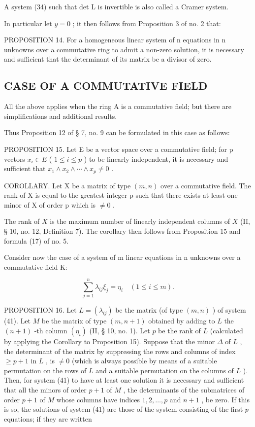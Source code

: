 A system (34) such that det L is invertible is also called a Cramer system.

In particular let \(y = 0\) ; it then follows from Proposition 3 of no. 2 that:

PROPOSITION 14. For a homogeneous linear system of n equations in n unknowns over a commutative ring to admit a non-zero solution, it is necessary and sufficient that the determinant of its matrix be a divisor of zero.

\subsection{CASE OF A COMMUTATIVE FIELD}

All the above applies when the ring A is a commutative field; but there are simplifications and additional results.

Thus Proposition 12 of § 7, no. 9 can be formulated in this case as follows:

PROPOSITION 15. Let E be a vector space over a commutative field; for p vectors \(x_{i} \in E\) ( \(1 \leqslant i \leqslant p\) ) to be linearly independent, it is necessary and sufficient that \(x_{1} \wedge x_{2} \wedge \cdots \wedge x_{p} \neq 0\) .

COROLLARY. Let X be a matrix of type \((m, n)\) over a commutative field. The rank of X is equal to the greatest integer p such that there exists at least one minor of X of order p which is \(\neq0\) .

The rank of \(X\) is the maximum number of linearly independent columns of \(X\) (II, § 10, no. 12, Definition 7). The corollary then follows from Proposition 15 and formula (17) of no. 5.

Consider now the case of a system of m linear equations in n unknowns over a commutative field K:

\[
\sum_ {j = 1} ^ {n} \lambda_ {i j} \xi_ {j} = \eta_ {i} \quad (1 \leqslant i \leqslant m).\tag{41}
\]

PROPOSITION 16. Let \(L = (\lambda_{ij})\) be the matrix (of type \((m, n)\) ) of system (41). Let \(M\) be the matrix of type \((m, n + 1)\) obtained by adding to \(L\) the \((n + 1)\) -th column \((\eta_i)\) (II, § 10, no. 1). Let \(p\) be the rank of \(L\) (calculated by applying the Corollary to Proposition 15). Suppose that the minor \(\Delta\) of \(L\) , the determinant of the matrix by suppressing the rows and columns of index \(\geqslant p + 1\) in \(L\) , is \(\neq 0\) (which is always possible by means of a suitable permutation on the rows of \(L\) and a suitable permutation on the columns of \(L\) ). Then, for system (41) to have at least one solution it is necessary and sufficient that all the minors of order \(p + 1\) of \(M\) , the determinants of the submatrices of order \(p + 1\) of \(M\) whose columns have indices \(1, 2, \ldots, p\) and \(n + 1\) , be zero. If this is so, the solutions of system (41) are those of the system consisting of the first \(p\) equations; if they are written

